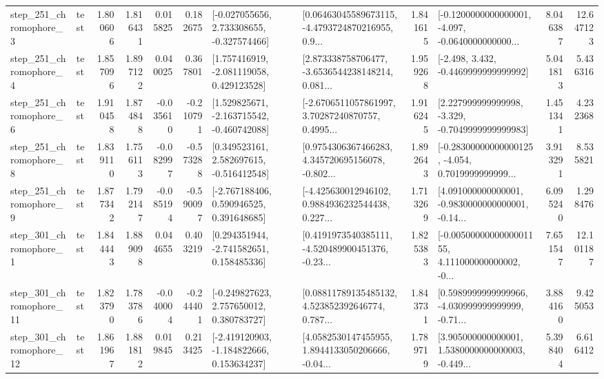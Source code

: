 \begin{tabular}{llrrrrllrlrr}
   step\_251\_chromophore\_3 &      test &      1.800606 &    1.816431 &      0.015825 &  0.182675 &   [-0.027055656, 2.733308655, -0.327574466] &  [0.06463045589673115, -4.4793724870216955, 0.9... &       1.841615 &  [-0.1200000000000001, -4.097, -0.0640000000000... &            8.046387 &         12.647123 \\
   step\_251\_chromophore\_4 &      test &      1.857096 &    1.897122 &      0.040025 &  0.367801 &    [1.757416919, -2.081119058, 0.429123528] &  [2.873338758706477, -3.6536544238148214, 0.081... &       1.959268 &               [-2.498, 3.432, -0.4469999999999992] &            5.041813 &          5.436316 \\
   step\_251\_chromophore\_6 &      test &      1.910458 &    1.874848 &     -0.035610 & -0.210791 &   [1.529825671, -2.163715542, -0.460742088] &  [-2.6706511057861997, 3.70287240870757, 0.4995... &       1.916245 &   [2.227999999999998, -3.329, -0.7049999999999983] &            1.451341 &          4.232368 \\
   step\_251\_chromophore\_8 &      test &      1.839110 &    1.756113 &     -0.082997 & -0.573288 &    [0.349523161, 2.582697615, -0.516412548] &  [0.9754306367466283, 4.345720695156078, -0.802... &       1.892643 &  [-0.28300000000000125, -4.054, 0.7019999999999... &            3.913291 &          8.535821 \\
   step\_251\_chromophore\_9 &      test &      1.877342 &    1.792147 &     -0.085194 & -0.590097 &    [-2.767188406, 0.590946525, 0.391648685] &  [-4.425630012946102, 0.9884936232544438, 0.227... &       1.713269 &  [4.091000000000001, -0.9830000000000001, -0.14... &            6.095240 &          1.298476 \\
   step\_301\_chromophore\_1 &      test &      1.844443 &    1.889098 &      0.044655 &  0.403219 &    [0.294351944, -2.741582651, 0.158485336] &  [0.4191973540385111, -4.520489900451376, -0.23... &       1.825383 &  [-0.0050000000000001155, 4.111000000000002, -0... &            7.651547 &         12.101187 \\
  step\_301\_chromophore\_11 &      test &      1.823790 &    1.783786 &     -0.040004 & -0.244401 &    [-0.249827623, 2.757650012, 0.380783727] &  [0.08811789135485132, 4.523852392646774, 0.787... &       1.843731 &  [0.5989999999999966, -4.030999999999999, -0.71... &            3.884160 &          9.425053 \\
  step\_301\_chromophore\_12 &      test &      1.861967 &    1.881812 &      0.019845 &  0.213425 &   [-2.419120903, -1.184822666, 0.153634237] &  [4.0582530147455955, 1.8944133050206666, -0.04... &       1.789719 &  [3.905000000000001, 1.5380000000000003, -0.449... &            5.398404 &          6.616412 \\

\end{tabular}
